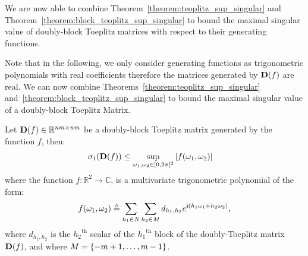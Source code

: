 We are now able to combine Theorem~\ref{theorem:teoplitz_sup_singular} and Theorem~\ref{theorem:block_teoplitz_sup_singular} to bound the maximal singular value of doubly-block Toeplitz matrices with respect to their generating functions. 

Note that in the following, we only consider generating functions as trigonometric polynomials with real coefficients therefore the matrices generated by $\mathbf{D}(f)$ are real. We can now combine Theorems~\ref{theorem:teoplitz_sup_singular} and~\ref{theorem:block_teoplitz_sup_singular} to bound the maximal singular value of a doubly-block Toeplitz Matrix. 

\begin{theorem} \label{theorem:doubly_block_teoplitz_sup_singular}
Let $\mathbf{D}(f) \in \mathbb{R}^{nm \times nm}$ be a doubly-block Toeplitz matrix generated by the function $f$, then:
\begin{align}
  \sigma_{1} \left( \Dmat(f) \right) &\leq \sup_{\omega_1, \omega_2 \in [0, 2\pi]^2}|f(\omega_1,\omega_2)|
\end{align}
where the function $f: \mathbb{R}^2 \rightarrow \mathbb{C}$, is a multivariate trigonometric polynomial of the form:
\begin{equation}\label{equation:muli_variate_poly_on_M}
    f(\omega_1, \omega_2) \triangleq \sum_{h_1 \in N} \sum_{h_2 \in M} d_{h_1, h_2} e^{\mathbf{i} (h_1 \omega_1 + h_2 \omega_2)},
\end{equation}
where $d_{h_{1},h_{2}}$ is the ${h_2}^\textrm{th}$ scalar of the ${h_1}^\textrm{th}$ block of the doubly-Toeplitz matrix $\mathbf{D}(f)$, and where $M = \{-m+1,\dots, m-1 \}$.
\end{theorem}


